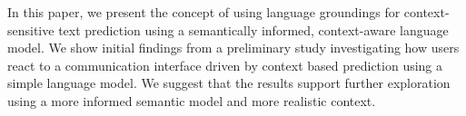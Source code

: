 In this paper, we present the concept of using language groundings for context-sensitive text prediction using a semantically informed, context-aware language model. We show initial findings from a preliminary study investigating how users react to a communication interface driven by context based prediction using a simple language model. We suggest that the results support further exploration using a more informed semantic model and more realistic context.

